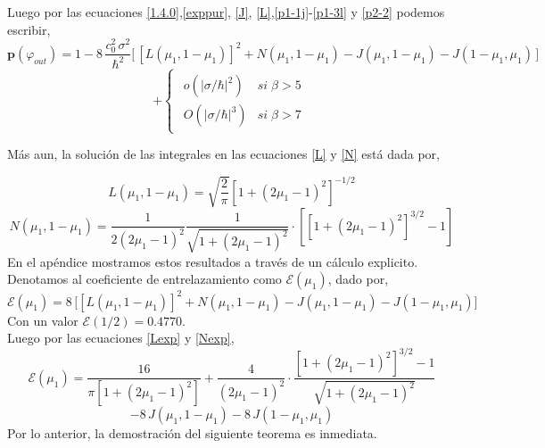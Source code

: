 \documentclass[12pt]{book}
\numberwithin{equation}{chapter}
\def\E{\mathcal{E}}
\def\vp{\varphi}
\def\P{\mathbf{p}}
\begin{document}
\newpage

Luego por las ecuaciones \eqref{1.4.0},\eqref{exppur}, \eqref{J}, \eqref{L},\eqref{p1-1j}-\eqref{p1-3l} y \eqref{p2-2} podemos escribir,
$$ \P (\vp_{out})= 1 - 8\, \frac{c_{0}^{2}\, \sigma^{2}}{\hbar^{2}} \Big[ \,[L(\mu_{1},1-\mu_{1})]^{2} + N(\mu_{1},1-\mu_{1}) - J(\mu_{1},1-\mu_{1}) - J(1-\mu_{1},\mu_{1})\, \Big] $$
\begin{equation}\label{1.110}
+\begin{cases} \begin{matrix} o(|\sigma/\hbar|^{2}) & si\; \beta >5 \\ O(|\sigma/\hbar|^{3}) & si\; \beta > 7 \end{matrix} \end{cases}
\end{equation}

M\'as aun, la soluci\'on de las integrales en las ecuaciones \eqref{L} y \eqref{N} est\'a dada por,

\begin{equation}\label{Lexp}
L(\mu_{1},1-\mu_{1})= \sqrt{\frac{2}{\pi}} [ 1+(2\mu_{1}-1)^{2} ]^{-1/2}
\end{equation}
\begin{equation}\label{Nexp}
N(\mu_{1},1-\mu_{1})= \frac{1}{2(2\mu_{1}-1)^{2}} \frac{1}{\sqrt{1+(2\mu_{1}-1)^{2}}}\cdot \left[ [1+(2\mu_{1}-1)^{2}]^{3/2} -1 \right]
\end{equation}
En el ap\'endice mostramos estos resultados a trav\'es de un c\'alculo explicito.\\

Denotamos al coeficiente de entrelazamiento como $\E (\mu_{1})$, dado por,
\begin{equation}\label{Eps}
\E(\mu_{1}) = 8 \, \Big[ [L(\mu_{1},1-\mu_{1})]^{2} + N(\mu_{1},1-\mu_{1}) - J(\mu_{1},1-\mu_{1}) - J(1-\mu_{1},\mu_{1}) \Big]
\end{equation}
Con un valor $\E(1/2)= 0.4770 $.\\
Luego por las ecuaciones \eqref{Lexp} y \eqref{Nexp},
$$ \E(\mu_{1})= \frac{16}{\pi [1+(2\mu_{1}-1)^{2}]} + \frac{4}{(2\mu_{1}-1)^{2}} \cdot \frac{[1+(2\mu_{1}-1)^{2}]^{3/2} - 1}{\sqrt{1+(2\mu_{1}-1)^{2}}} $$
\begin{equation}\label{eps-2}
- 8\, J(\mu_{1},1-\mu_{1}) - 8 \, J(1-\mu_{1},\mu_{1})
\end{equation}
Por lo anterior, la demostraci\'on del siguiente teorema es inmediata.
\end{document}
